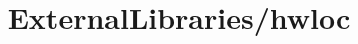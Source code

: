 \documentclass{article}
\begin{document}
\title{ExternalLibraries/hwloc}

\maketitle


\end{document}
